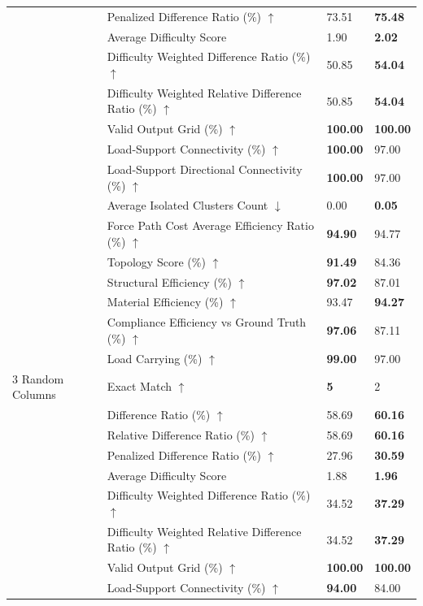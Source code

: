 \begin{table}[!h]
{\begin{tabular}{llll}
 & Penalized Difference Ratio (\%) $\uparrow$ & 73.51 & \textbf{75.48} \\
 & Average Difficulty Score & 1.90 & \textbf{2.02} \\
 & Difficulty Weighted Difference Ratio (\%) $\uparrow$ & 50.85 & \textbf{54.04} \\
 & Difficulty Weighted Relative Difference Ratio (\%) $\uparrow$ & 50.85 & \textbf{54.04} \\
 & Valid Output Grid (\%) $\uparrow$ & \textbf{100.00} & \textbf{100.00} \\
 & Load-Support Connectivity (\%) $\uparrow$ & \textbf{100.00} & 97.00 \\
 & Load-Support Directional Connectivity (\%) $\uparrow$ & \textbf{100.00} & 97.00 \\
 & Average Isolated Clusters Count $\downarrow$ & 0.00 & \textbf{0.05} \\
 & Force Path Cost Average Efficiency Ratio (\%) $\uparrow$ & \textbf{94.90} & 94.77 \\
 & Topology Score (\%) $\uparrow$ & \textbf{91.49} & 84.36 \\
 & Structural Efficiency (\%) $\uparrow$ & \textbf{97.02} & 87.01 \\
 & Material Efficiency (\%) $\uparrow$ & 93.47 & \textbf{94.27} \\
 & Compliance Efficiency vs Ground Truth (\%) $\uparrow$ & \textbf{97.06} & 87.11 \\
 & Load Carrying (\%) $\uparrow$ & \textbf{99.00} & 97.00 \\
3 Random Columns & Exact Match $\uparrow$ & \textbf{5} & 2 \\
 & Difference Ratio (\%) $\uparrow$ & 58.69 & \textbf{60.16} \\
 & Relative Difference Ratio (\%) $\uparrow$ & 58.69 & \textbf{60.16} \\
 & Penalized Difference Ratio (\%) $\uparrow$ & 27.96 & \textbf{30.59} \\
 & Average Difficulty Score & 1.88 & \textbf{1.96} \\
 & Difficulty Weighted Difference Ratio (\%) $\uparrow$ & 34.52 & \textbf{37.29} \\
 & Difficulty Weighted Relative Difference Ratio (\%) $\uparrow$ & 34.52 & \textbf{37.29} \\
 & Valid Output Grid (\%) $\uparrow$ & \textbf{100.00} & \textbf{100.00} \\
 & Load-Support Connectivity (\%) $\uparrow$ & \textbf{94.00} & 84.00 \\

\end{tabular}}
\end{table}
